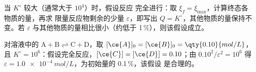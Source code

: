 \begin{method}[定量反应假设]\label{met:b1:extent-q-and-k:quantitative}
当 $K^\circ$ 较大（通常大于 $10^4$）时，假设反应
完全进行：取 $\xi_f = \xi_{\max}$，计算终态各物质的量，再求
限量反应物剩余的少量 $\varepsilon$，即写出 $Q =
K^\circ$，其他物质的量保持不变。若
$\varepsilon$ 与其他物质的量相比很小（约低于
1\,\%），则该假设成立。
\end{method}

\begin{example}[定量反应]\label{ex:b1:extent-q-and-k:quant}
对溶液中的 $\mathrm{A + B \rightleftharpoons C + D}$，取 $[\ce{A}]_0 = [\ce{B}]_0 =
\qty{0.10}{mol/L}$，且 $K^\circ = 10^6$：假设完全反应，$[\ce{C}]
= [\ce{D}] = 0.10$；由 $0.10^2/\varepsilon^2 = 10^6$ 得 $\varepsilon
= \qty{1.0e-4}{mol/L}$，为初始量的 0.1\,\%，该假设
是合理的。
\end{example}

